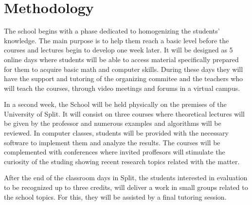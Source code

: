 \documentclass[letterpaper]{inzane_syllabus} %
\begin{document}
\vspace{0.5cm} %
\section{Methodology}

The school begins with a phase dedicated to homogenizing the students' knowledge. The main purpose is to help them reach a basic level before the courses and lectures begin to develop one week later. It will be designed as 5 online days where students will be able to access material specifically prepared for them to acquire basic math and computer skills. During these days they will have the support and tutoring of the organizing commitee and the teachers who will teach the courses, through video meetings and forums in a virtual campus.

In a second week, the School will be held physically on the premises of the University of Split. It will consist on three courses where  theoretical lectures will be given by the professor and numerous examples and algorithms will be reviewed. In computer classes, students will be provided with the necessary software to implement them and analyze the results. The courses will be complemented with conferences where invited proffesors will stimulate the curiosity of the studing showing recent research topics related with the matter.

After the end of the classroom days in Split, the students interested in evaluation to be recognized up to three credits, will deliver a work in small groups related to the school topics. For this, they will be assisted by a final tutoring session.


\newpage %

\makeSide %


\vspace{0.5cm} %
\end{document}
